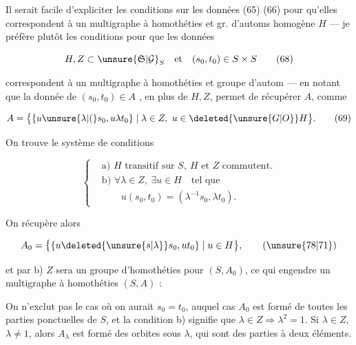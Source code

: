 
Il serait facile d'expliciter les conditions sur les données (65) (66) pour qu'elles correspondent à un multigraphe à homothéties et gr. d'automs homogène $H$ --- je préfère plutôt  les conditions pour que les données

\[
H,Z\subset\unsure{\mathfrak S|\mathcal G}_S\quad\text{et}\quad (s_0,t_0)\in S\times S
\tag*{(68)}
\]

correspondent à un multigraphe à homothéties et groupe d'autom  --- en notant que la donnée de $(s_0,t_0)\in A$ , en plus de $H,Z$, permet de récupérer $A$, comme

\[
A=\bigl\{\{u\unsure{\lambda|(}s_0,u\lambda t_0\}\mid\lambda\in Z,\ u\in\deleted{\unsure{G|O}}H\bigr\}.
\tag*{(69)}
\]

On trouve le système de conditions

\[
\left\{\begin{aligned}
&\text{a) }H\text{ transitif sur }S,\ H\text{ et }Z\text{ commutent.}\\
&\text{b) }\forall\lambda\in Z,\ \exists u\in H\quad\text{tel que}\\
&\qquad u(s_0,t_0)=(\lambda^{-1}s_0,\lambda t_0).
\end{aligned}\right.
\tag*{(70)}
\]

On récupère alors 

\[
A_0=\bigl\{\{u\deleted{\unsure{s|\lambda}}s_0,ut_0\}\mid u\in H\bigr\},
\tag*{(\unsure{78|71})}
\]

et par b) $Z$ sera un groupe d'homothéties pour $(S,A_0)$, ce qui engendre un multigraphe à homothéties $(S,A)$ :

On n'exclut pas le cas où on aurait $s_0=t_0$, auquel cas $A_0$ est formé de toutes les parties ponctuelles de $S$, et la condition b) signifie que $\lambda\in Z\Longrightarrow\lambda^2=1$. Si $\lambda\in Z$, $\lambda\ne1$, alors $A_\lambda$ est formé des orbites sous $\lambda$, qui sont des parties à deux éléments. 

